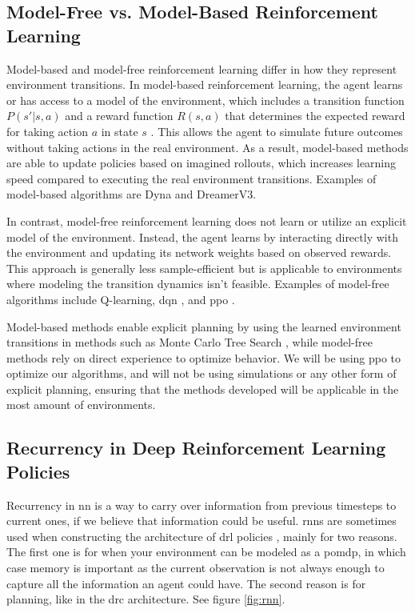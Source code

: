 \documentclass[UKenglish]{uiomasterthesis}
\begin{document}
\subsection{Model-Free vs. Model-Based Reinforcement Learning}

Model-based and model-free reinforcement learning differ in how they represent environment transitions. In model-based reinforcement learning, the agent learns or has access to a model of the environment, which includes a transition function \( P(s' | s, a) \) and a reward function \( R(s, a) \) that determines the expected reward for taking action \( a \) in state \( s \) \cite{moerland2022modelbasedreinforcementlearningsurvey}. This allows the agent to simulate future outcomes without taking actions in the real environment. As a result, model-based methods are able to update policies based on imagined rollouts, which increases learning speed compared to executing the real environment transitions. Examples of model-based algorithms are Dyna\cite{10.1145/122344.122377} and DreamerV3\cite{hafner2024masteringdiversedomainsworld}.

In contrast, model-free reinforcement learning does not learn or utilize an explicit model of the environment. Instead, the agent learns by interacting directly with the environment and updating its network weights based on observed rewards. This approach is generally less sample-efficient but is applicable to environments where modeling the transition dynamics isn't feasible. Examples of model-free algorithms include Q-learning, \ac{dqn} \cite{mnih2013playingatarideepreinforcement}, and \ac{ppo} \cite{schulman2017proximalpolicyoptimizationalgorithms}.

Model-based methods enable explicit planning by using the learned environment transitions in methods such as Monte Carlo Tree Search \cite{_wiechowski_2022}, while model-free methods rely on direct experience to optimize behavior. We will be using \ac{ppo} to optimize our algorithms, and will not be using simulations or any other form of explicit planning, ensuring that the methods developed will be applicable in the most amount of environments.

\subsection{Recurrency in Deep Reinforcement Learning Policies}
Recurrency in \ac{nn} is a way to carry over information from previous timesteps to current ones, if we believe that information could be useful. \acp{rnn} are sometimes used when constructing the architecture of \ac{drl} policies \cite{hausknecht2017deeprecurrentqlearningpartially}, mainly for two reasons. The first one is for when your environment can be modeled as a \ac{pomdp}, in which case memory is important as the current observation is not always enough to capture all the information an agent could have. The second reason is for planning, like in the \ac{drc} architecture\cite{guez2019investigationmodelfreeplanning}. See figure \ref{fig:rnn}.
\end{document}
